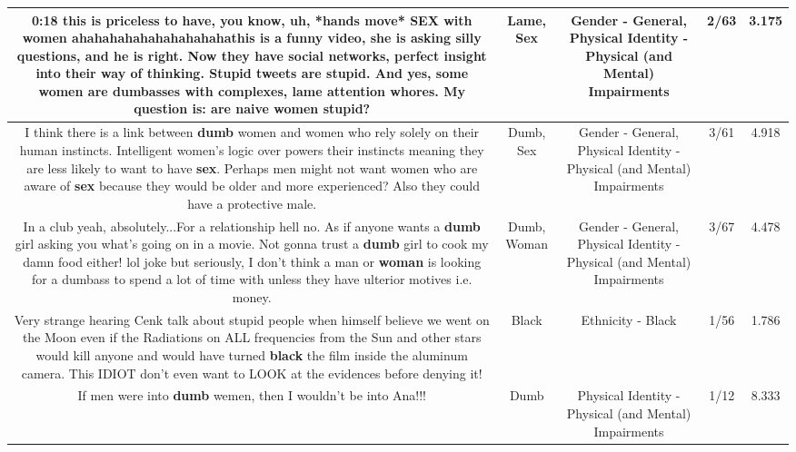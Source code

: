 \documentclass[11pt]{article}
\newlength\mylength
\begin{document}
\begin{center}
\begin{longtable}{|C{.65\mylength}|C{.30\mylength}|C{.12\mylength}|C{.12\mylength}|C{.12\mylength}|}
  \small 0:18 this is priceless to have, you know, uh, *hands move* \textbf{SEX} with women ahahahahahahahahahahathis is a funny video, she is asking silly questions, and he is right. Now they have social networks, perfect insight into their way of thinking. Stupid tweets are stupid. And yes, some women are dumbasses with complexes, \textbf{lame} attention whores. My question is: are naive women stupid?\normalsize   & Lame, Sex & Gender - General, Physical Identity - Physical (and Mental) Impairments & 2/63 & 3.175 \\  \hline
  \small I think there is a link between \textbf{dumb} women and women who rely solely on their human instincts. Intelligent women's logic over powers their instincts meaning they are less likely to want to have \textbf{sex}. Perhaps men might not want women who are aware of \textbf{sex} because they would be older and more experienced? Also they could have a protective male.\normalsize   & Dumb, Sex & Gender - General, Physical Identity - Physical (and Mental) Impairments & 3/61 & 4.918 \\  \hline
  \small In a club yeah, absolutely...For a relationship hell no. As if anyone wants a \textbf{dumb} girl asking you what's going on in a movie. Not gonna trust a \textbf{dumb} girl to cook my damn food either! lol joke but seriously, I don't think a man or \textbf{woman} is looking for a dumbass to spend a lot of time with unless they have ulterior motives i.e. money.\normalsize   & Dumb, Woman & Gender - General, Physical Identity - Physical (and Mental) Impairments & 3/67 & 4.478 \\  \hline
  \small Very strange hearing Cenk talk about stupid people when himself believe we went on the Moon even if the Radiations on ALL frequencies from the Sun and other stars would kill anyone and would have turned \textbf{black} the film inside the aluminum camera. This IDIOT don't even want to LOOK at the evidences before denying it!\normalsize   & Black & Ethnicity - Black & 1/56 & 1.786 \\  \hline
  \small If men were into \textbf{dumb} wemen, then I wouldn't be into Ana!!!\normalsize   & Dumb & Physical Identity - Physical (and Mental) Impairments & 1/12 & 8.333 \\  \hline

\end{longtable}
\end{center}
\end{document}
